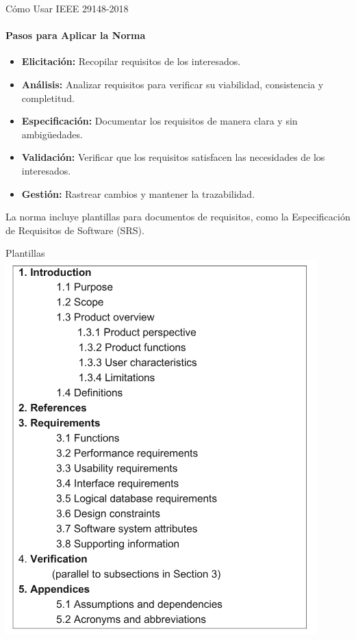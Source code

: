 \documentclass[
  24pt, %
  aspectratio=169, %
]{beamer}
\begin{document}

\begin{frame}{Cómo Usar IEEE 29148-2018}
\framesubtitle{Pasos para Aplicar la Norma}
\begin{itemize}
    \item \textbf{Elicitación:} Recopilar requisitos de los interesados.
    \item \textbf{Análisis:} Analizar requisitos para verificar su viabilidad, consistencia y completitud.
    \item \textbf{Especificación:} Documentar los requisitos de manera clara y sin ambigüedades.
    \item \textbf{Validación:} Verificar que los requisitos satisfacen las necesidades de los interesados.
    \item \textbf{Gestión:} Rastrear cambios y mantener la trazabilidad.
\end{itemize}
La norma incluye plantillas para documentos de requisitos, como la Especificación de Requisitos de Software (SRS).\
\end{frame}

\begin{frame}{Plantillas}
  \centering
  \includegraphics[width=0.4\linewidth]{plantilla.png}
\end{frame}
\end{document}

